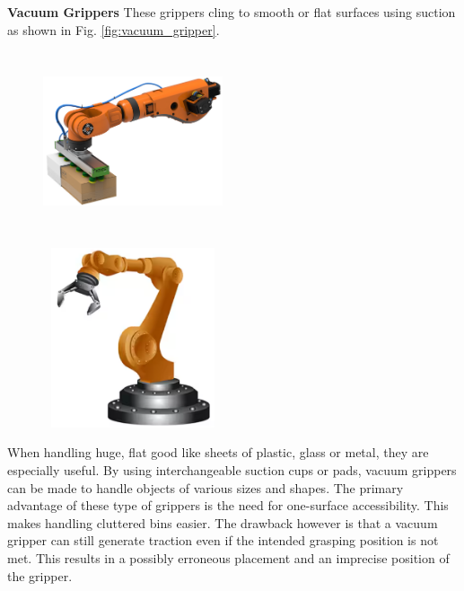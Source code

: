 \textbf{Vacuum Grippers} These grippers cling to smooth or flat  surfaces using suction as shown in Fig. \ref{fig:vacuum_gripper}.
\begin{figure}
  \centering
  \begin{minipage}[t]{.45\textwidth}
    \centering
    \includegraphics[width=150pt,height=150pt]{pictures/vacuum_gripper.png}
    \label{fig:vacuum_gripper}
  \end{minipage}%
  \hspace{1cm}
  \begin{minipage}[t]{.45\textwidth}
    \centering
    \includegraphics[width=150pt,height=150pt]{pictures/mechanical_gripper.png}
    \label{fig:mechanical_gripper}
  \end{minipage}
\end{figure}
When handling huge, flat good like sheets of plastic, glass or metal, they are especially useful. By using interchangeable suction cups or pads, vacuum grippers can be made to handle objects of various sizes and shapes. The primary advantage of these type of grippers is the need for one-surface accessibility. This makes handling cluttered bins easier. The drawback however is that a vacuum gripper can still generate traction even if the intended grasping position is not met. This results in a possibly erroneous placement and an imprecise position of the gripper.\cite{spenrath2022heuristic}

